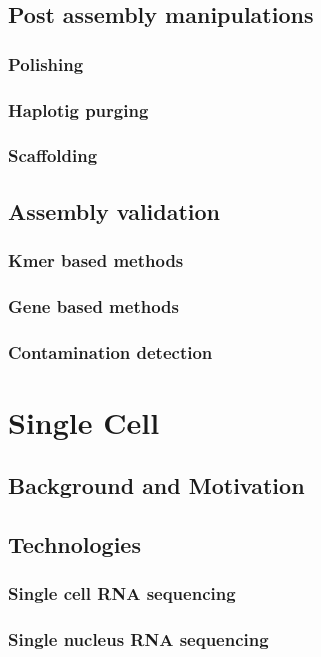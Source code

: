 \subsection{Post assembly manipulations}
\subsubsection{Polishing}
\subsubsection{Haplotig purging}
\subsubsection{Scaffolding}

\subsection{Assembly validation}
\subsubsection{Kmer based methods}
\subsubsection{Gene based methods}
\subsubsection{Contamination detection}

\section{Single Cell}
\subsection{Background and Motivation}
\subsection{Technologies}
\subsubsection{Single cell RNA sequencing}
\subsubsection{Single nucleus RNA sequencing}
